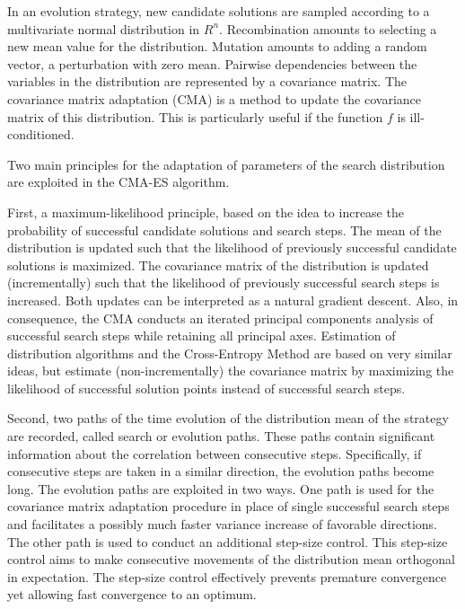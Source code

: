 In an evolution strategy, new candidate solutions are sampled according to a multivariate normal distribution in ${R}^{n}$. Recombination amounts to selecting a new mean value for the distribution. Mutation amounts to adding a random vector, a perturbation with zero mean. Pairwise dependencies between the variables in the distribution are represented by a covariance matrix. The covariance matrix adaptation (CMA) is a method to update the covariance matrix of this distribution. This is particularly useful if the function $f$ is ill-conditioned.

Two main principles for the adaptation of parameters of the search distribution are exploited in the CMA-ES algorithm.

First, a maximum-likelihood principle, based on the idea to increase the probability of successful candidate solutions and search steps. The mean of the distribution is updated such that the likelihood of previously successful candidate solutions is maximized. The covariance matrix of the distribution is updated (incrementally) such that the likelihood of previously successful search steps is increased. Both updates can be interpreted as a natural gradient descent. Also, in consequence, the CMA conducts an iterated principal components analysis of successful search steps while retaining all principal axes. Estimation of distribution algorithms and the Cross-Entropy Method are based on very similar ideas, but estimate (non-incrementally) the covariance matrix by maximizing the likelihood of successful solution points instead of successful search steps.

Second, two paths of the time evolution of the distribution mean of the strategy are recorded, called search or evolution paths. These paths contain significant information about the correlation between consecutive steps. Specifically, if consecutive steps are taken in a similar direction, the evolution paths become long. The evolution paths are exploited in two ways. One path is used for the covariance matrix adaptation procedure in place of single successful search steps and facilitates a possibly much faster variance increase of favorable directions. The other path is used to conduct an additional step-size control. This step-size control aims to make consecutive movements of the distribution mean orthogonal in expectation. The step-size control effectively prevents premature convergence yet allowing fast convergence to an optimum.

